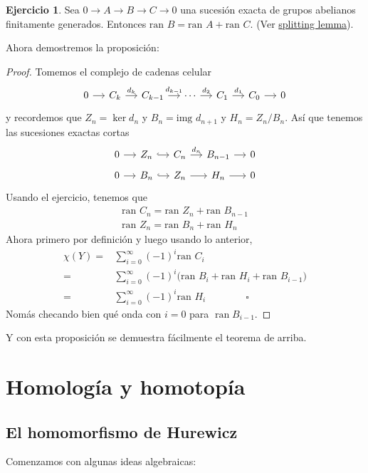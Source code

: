 \documentclass[spanish]{book}
\theoremstyle{definition}
\newtheorem*{ejer}{Ejercicio}
\DeclareMathOperator{\ran}{ran}
\begin{document}
	\begin{ejer}
		Sea $0\to A\to B\to C\to 0$ una sucesión exacta de grupos abelianos finitamente generados. Entonces $\text{ran }B=\text{ran }A+\text{ran }C$. (Ver \hyperref[subsec:splitting]{splitting lemma}).
	\end{ejer}
	Ahora demostremos la proposición:
	\begin{proof}
		Tomemos el complejo de cadenas celular
		\[\begin{tikzcd}[column sep=small]
			0 \arrow[r] & C_k \arrow[r, "d_k"] & C_{k-1} \arrow[r, "d_{k-1}"] & \cdots \arrow[r, "d_2"] & C_1 \arrow[r, "d_1"] & C_0 \arrow[r] & 0
		\end{tikzcd}\]
		y recordemos que $Z_n=\ker d_n$ y $B_n=\text{img }d_{n+1}$ y $H_n=Z_n/B_n$. Así que tenemos las sucesiones exactas cortas
		\[\begin{tikzcd}[column sep=small,row sep=tiny]
			0\arrow[r]&Z_n\arrow[hook,r]&C_n\arrow[r,"d_n"]&B_{n-1}\arrow[r]&0\\
			0\arrow[r]&B_n\arrow[r,hook]&Z_n\arrow[r]&H_n\arrow[r]&0
		\end{tikzcd}\]
		Usando el ejercicio, tenemos que
		\begin{align*}
			\text{ran }C_n=\text{ran }Z_n+\text{ran }B_{n-1}\\
			\text{ran }Z_n=\text{ran }B_n+\text{ran }H_{n}
		\end{align*}
		Ahora primero por definición y luego usando lo anterior,
		\begin{align*}\chi(Y)=&\sum_{i=0}^\infty(-1)^i\text{ran }C_i\\
			=&\sum_{i=0}^\infty(-1)^i\Big(\text{ran }B_i+\text{ran }H_i+\text{ran }B_{i-1}\Big)\\
			=&\sum_{i=0}^\infty(-1)^i\text{ran }H_i\qquad\qquad\square
		\end{align*}
		Nomás checando bien qué onda con $i=0$ para $\ran B_{i-1}$.
	\end{proof}
	Y con esta proposición se demuestra fácilmente el teorema de arriba.

\chapter{Homología y homotopía}	
\section{El homomorfismo de Hurewicz}
Comenzamos con algunas ideas algebraicas:
\end{document}

